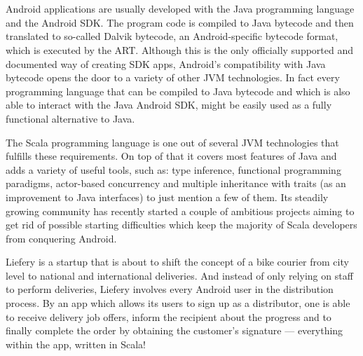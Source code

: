 \section*{}

Android applications are usually developed with the Java programming language and the Android \ac{SDK}. The program code
is compiled to Java bytecode and then translated to so-called Dalvik bytecode, an Android-specific bytecode format,
which is executed by the \ac{ART}. Although this is the only officially supported and documented way of creating SDK
apps, Android's compatibility with Java bytecode opens the door to a variety of other \ac{JVM} technologies. In fact
every programming language that can be compiled to Java bytecode and which is also able to interact with the Java
Android SDK, might be easily used as a fully functional alternative to Java.

The Scala programming language is one out of several JVM technologies that fulfills these requirements. On top of that
it covers most features of Java and adds a variety of useful tools, such as: type inference, functional programming
paradigms, actor-based concurrency and multiple inheritance with traits (as an improvement to Java interfaces) to just
mention a few of them. Its steadily growing community has recently started a couple of ambitious projects aiming to get
rid of possible starting difficulties which keep the majority of Scala developers from conquering Android.

Liefery is a startup that is about to shift the concept of a bike courier from city level to national and international
deliveries. And instead of only relying on staff to perform deliveries, Liefery involves every Android user in the
distribution process. By an app which allows its users to sign up as a distributor, one is able to receive delivery job
offers, inform the recipient about the progress and to finally complete the order by obtaining the customer's signature
— everything within the app, written in Scala!